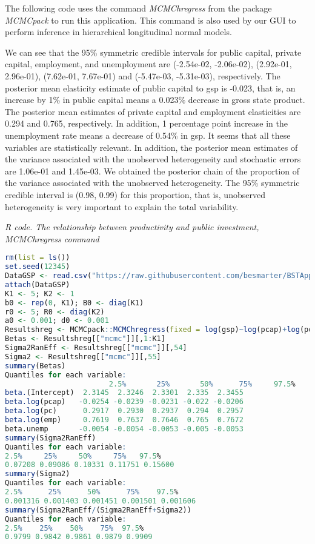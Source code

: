 The following code uses the command \textit{MCMChregress} from the package \textit{MCMCpack} to run this application. This command is also used by our GUI to perform inference in hierarchical longitudinal normal models.

We can see that the 95\% symmetric credible intervals for public capital, private capital, employment, and unemployment are (-2.54e-02, -2.06e-02), (2.92e-01, 2.96e-01), (7.62e-01, 7.67e-01) and (-5.47e-03, -5.31e-03), respectively. The posterior mean elasticity estimate of public capital to gsp is -0.023, that is, an increase by 1\% in public capital means a 0.023\% decrease in gross state product. The posterior mean estimates of private capital and employment elasticities are 0.294 and 0.765, respectively. In addition, 1 percentage point increase in the unemployment rate means a decrease of 0.54\% in gsp. It seems that all these variables are statistically relevant. In addition, the posterior mean estimates of the variance associated with the unobserved heterogeneity and stochastic errors are 1.06e-01 and 1.45e-03. We obtained the posterior chain of the proportion of the variance associated with the unobserved heterogeneity. The 95\% symmetric credible interval is (0.98, 0.99) for this proportion, that is, unobserved heterogeneity is very important to explain the total variability.

\begin{tcolorbox}[enhanced,width=4.67in,center upper,
	fontupper=\large\bfseries,drop shadow southwest,sharp corners]
	\textit{R code. The relationship between productivity and public investment, MCMChregress command}
	\begin{VF}
		\begin{lstlisting}[language=R]
rm(list = ls())
set.seed(12345)
DataGSP <- read.csv("https://raw.githubusercontent.com/besmarter/BSTApp/refs/heads/master/DataApp/8PublicCap.csv", sep = ",", header = TRUE, quote = "")
attach(DataGSP)
K1 <- 5; K2 <- 1
b0 <- rep(0, K1); B0 <- diag(K1)
r0 <- 5; R0 <- diag(K2)
a0 <- 0.001; d0 <- 0.001
Resultshreg <- MCMCpack::MCMChregress(fixed = log(gsp)~log(pcap)+log(pc)+log(emp)+unemp, random = ~1, group = "id", data = DataGSP, burnin = 5000, mcmc = 10000, thin = 1, r = r0, R = R0, nu = a0, delta = d0)
Betas <- Resultshreg[["mcmc"]][,1:K1]
Sigma2RanEff <- Resultshreg[["mcmc"]][,54]
Sigma2 <- Resultshreg[["mcmc"]][,55]
summary(Betas)
Quantiles for each variable:
						2.5%       25%       50%      75%     97.5%
beta.(Intercept)  2.3145  2.3246  2.3301  2.335  2.3455
beta.log(pcap)   -0.0254 -0.0239 -0.0231 -0.022 -0.0206
beta.log(pc)      0.2917  0.2930  0.2937  0.294  0.2957
beta.log(emp)     0.7619  0.7637  0.7646  0.765  0.7672
beta.unemp       -0.0054 -0.0054 -0.0053 -0.005 -0.0053
summary(Sigma2RanEff)
Quantiles for each variable:
2.5%     25%     50%     75%   97.5% 
0.07208 0.09086 0.10331 0.11751 0.15600 
summary(Sigma2)
Quantiles for each variable:
2.5%      25%      50%      75%    97.5% 
0.001316 0.001403 0.001451 0.001501 0.001606 
summary(Sigma2RanEff/(Sigma2RanEff+Sigma2))
Quantiles for each variable:
2.5%    25%    50%    75%  97.5% 
0.9799 0.9842 0.9861 0.9879 0.9909
\end{lstlisting}
	\end{VF}
\end{tcolorbox}


